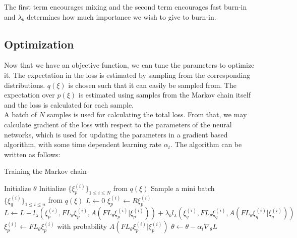 \documentclass[letterpaper,english,10pt]{article}
\begin{document}

The first term encourages mixing and the second term encourages fast burn-in and $\lambda_b$ determines how much importance we wish to give to burn-in.

\subsection{Optimization}
Now that we have an objective function, we can tune the parameters to optimize it. The expectation in the loss is estimated by sampling from the corresponding distributions. $q(\xi)$ is chosen such that it can easily be sampled from. The expectation over $p(\xi)$ is estimated using samples from the Markov chain itself and the loss is calculated for each sample. \\
A batch of $N$ samples is used for calculating the total loss. From that, we may calculate gradient of the loss with respect to the parameters of the neural networks, which is used for updating the parameters in a gradient based algorithm, with some time dependent learning rate $\alpha_t$. The algorithm can be written as follows:

\begin{algorithm}
\caption{Training the Markov chain}\label{Training}
\begin{algorithmic}[0]


\State Initialize $\theta$
\State Initialize $\{ \xi_p^{(i)} \}_{1 \leq i \leq N}$ from $q(\xi)$
	\State Sample a mini batch $\{ \xi_q^{(i)} \}_{1 \leq i \leq n}$ from $q(\xi)$
	\State $L \leftarrow 0$
		\State $\xi_p^{(i)} \leftarrow R \xi_p^{(i)}$
		\State $L \leftarrow L + l_\lambda(\xi_p^{(i)}, FL_\theta \xi_p^{(i)}, A(FL_\theta \xi_p^{(i)} | \xi_p^{(i)})) + \lambda_b l_\lambda(\xi_q^{(i)}, FL_\theta \xi_q^{(i)}, A(FL_\theta \xi_q^{(i)} | \xi_q^{(i)}))$
		\State $\xi_p^{(i)} \leftarrow FL_\theta \xi_p^{(i)}$ with probability $A(FL_\theta \xi_p^{(i)} | \xi_p^{(i)})$
	\EndFor
	\State $\theta \leftarrow \theta - \alpha_t \nabla_\theta L$
\EndFor

\end{algorithmic}
\end{algorithm}

\clearpage



\end{document}

